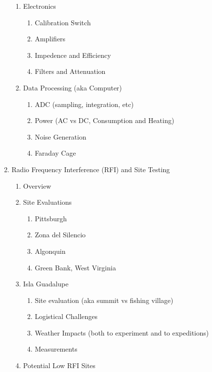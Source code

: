 \documentclass[12pt,twoside]{report}
\begin{document}
\begin{enumerate}
\begin{enumerate}
\item Electronics

\begin{enumerate}
\item Calibration Switch
\item Amplifiers
\item Impedence and Efficiency
\item Filters and Attenuation
\end{enumerate}

\item Data Processing (aka Computer)

\begin{enumerate}
\item ADC (sampling, integration, etc)
\item Power (AC vs DC, Consumption and Heating)
\item Noise Generation
\item Faraday Cage
\end{enumerate}

\end{enumerate}


\item Radio Frequency Interference (RFI) and Site Testing

\begin{enumerate}
\item Overview
\item Site Evaluations

\begin{enumerate}
\item Pittsburgh
\item Zona del Silencio
\item Algonquin 
\item Green Bank, West Virginia
\end{enumerate}

\item Isla Guadalupe

\begin{enumerate}
\item Site evaluation (aka summit vs fishing village)
\item Logistical Challenges
\item Weather Impacts (both to experiment and to expeditions)
\item Measurements 
\end{enumerate}

\item Potential Low RFI Sites


\end{enumerate}
\end{enumerate}
\end{document}

